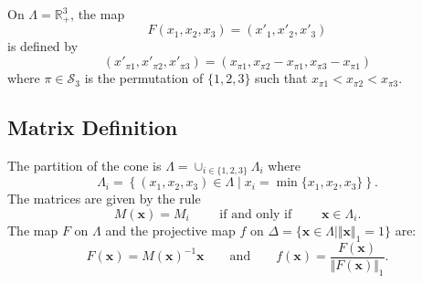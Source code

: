 On $\Lambda=\mathbb{R}^3_+$, the map
\[
F (x_1,x_2,x_3) = (x'_1,x'_2,x'_3)
\]
is defined by
\[
    (x'_{\pi 1}, x'_{\pi 2}, x'_{\pi 3}) =
    (x_{\pi 1}, x_{\pi 2}-x_{\pi 1}, x_{\pi 3}-x_{\pi 1})
\]
where $\pi\in\mathcal{S}_3$ is the permutation of $\{1,2,3\}$ such that
$x_{\pi 1}<x_{\pi 2}<x_{\pi 3}$.
\subsection{Matrix Definition}
The partition of the cone is
$\Lambda=\cup_{i\in\{1,2,3\}}\Lambda_i$ where
\[
    \Lambda_i = \left\{(x_1,x_2,x_3)\in\Lambda\mid 
    x_i = \min\{x_1,x_2,x_3\}\right\}.
\]
The matrices are given by the rule
\[
    M(\mathbf{x}) = M_i
    \qquad\text{ if and only if }\qquad
    \mathbf{x}\in\Lambda_i.
\]
The map $F$ on $\Lambda$ and
the projective map $f$ on
$\Delta=\{\mathbf{x}\in\Lambda\mid\Vert\mathbf{x}\Vert_1=1\}$ are:
\[
    F(\mathbf{x}) = M(\mathbf{x})^{-1}\mathbf{x}
    \qquad\text{and}\qquad
    f(\mathbf{x}) = \frac{F(\mathbf{x})}{\Vert F(\mathbf{x})\Vert_1}.
\]

